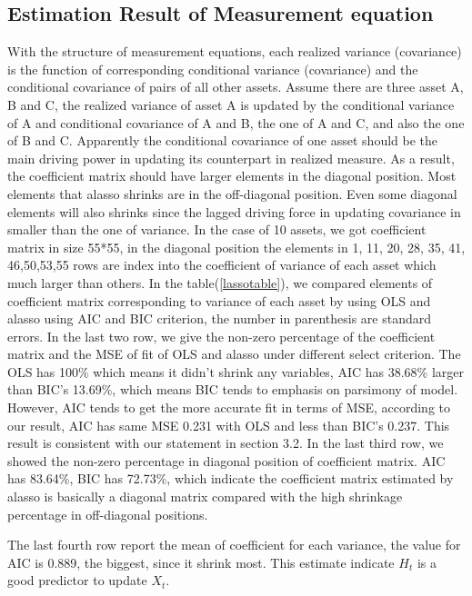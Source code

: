 \documentclass[titlepage,11pt]{article}
\begin{document}
\subsection{Estimation Result of Measurement equation}
With the structure of measurement equations, each realized variance (covariance) is the function of  corresponding conditional variance (covariance) and the conditional covariance of pairs of all other assets. Assume there are three asset A, B and C, the realized variance of asset A is updated by the conditional variance of A and conditional covariance of A and B, the one of A and C,  and also the one of B and C. Apparently the conditional covariance of one asset should be the main driving power in updating its counterpart in realized measure. As a result, the coefficient matrix should have larger elements in the diagonal position. Most elements that alasso shrinks are in the off-diagonal position. Even some diagonal elements will also shrinks since the lagged driving force in updating covariance in smaller than the one of variance. In the case of 10 assets, we got coefficient matrix in size 55*55, in the diagonal position the elements in 1, 11, 20, 28, 35, 41, 46,50,53,55 rows are index into the coefficient of variance of each asset which much larger than others.  In the table(\ref{lassotable}), we compared  elements of coefficient matrix corresponding to variance of each asset by using OLS and alasso using AIC and BIC criterion, the number in parenthesis are standard errors. In the last two row, we give the non-zero percentage of the coefficient matrix and the MSE of fit of OLS and alasso under different select criterion. The OLS has 100\% which means it didn't shrink any variables, AIC has 38.68\% larger than BIC's 13.69\%, which means BIC tends to emphasis on parsimony of model. However, AIC tends to get the more accurate fit in terms of MSE, according to our result, AIC has same MSE 0.231 with OLS and less than BIC's 0.237. This result is consistent with our statement in section 3.2. In the last third row, we showed the non-zero percentage in diagonal position of coefficient matrix. AIC has 83.64\%, BIC has 72.73\%, which indicate the coefficient matrix estimated by alasso is basically a diagonal matrix compared with the high shrinkage percentage in off-diagonal positions.

The last fourth row report the mean of coefficient for each variance, the value for AIC is 0.889, the biggest, since it shrink most. This estimate indicate $H_t$ is a good predictor to update $X_t$.
\end{document}
